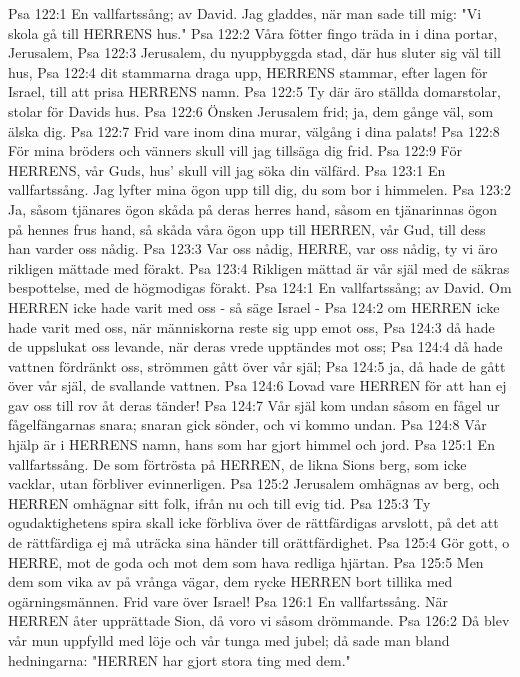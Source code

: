 Psa 122:1  En vallfartssång; av David. Jag gladdes, när man sade till mig: "Vi skola gå till HERRENS hus."
Psa 122:2  Våra fötter fingo träda in i dina portar, Jerusalem,
Psa 122:3  Jerusalem, du nyuppbyggda stad, där hus sluter sig väl till hus,
Psa 122:4  dit stammarna draga upp, HERRENS stammar, efter lagen för Israel, till att prisa HERRENS namn.
Psa 122:5  Ty där äro ställda domarstolar, stolar för Davids hus.
Psa 122:6  Önsken Jerusalem frid; ja, dem gånge väl, som älska dig.
Psa 122:7  Frid vare inom dina murar, välgång i dina palats!
Psa 122:8  För mina bröders och vänners skull vill jag tillsäga dig frid.
Psa 122:9  För HERRENS, vår Guds, hus' skull vill jag söka din välfärd.
Psa 123:1  En vallfartssång. Jag lyfter mina ögon upp till dig, du som bor i himmelen.
Psa 123:2  Ja, såsom tjänares ögon skåda på deras herres hand, såsom en tjänarinnas ögon på hennes frus hand, så skåda våra ögon upp till HERREN, vår Gud, till dess han varder oss nådig.
Psa 123:3  Var oss nådig, HERRE, var oss nådig, ty vi äro rikligen mättade med förakt.
Psa 123:4  Rikligen mättad är vår själ med de säkras bespottelse, med de högmodigas förakt.
Psa 124:1  En vallfartssång; av David. Om HERREN icke hade varit med oss - så säge Israel -
Psa 124:2  om HERREN icke hade varit med oss, när människorna reste sig upp emot oss,
Psa 124:3  då hade de uppslukat oss levande, när deras vrede upptändes mot oss;
Psa 124:4  då hade vattnen fördränkt oss, strömmen gått över vår själ;
Psa 124:5  ja, då hade de gått över vår själ, de svallande vattnen.
Psa 124:6  Lovad vare HERREN för att han ej gav oss till rov åt deras tänder!
Psa 124:7  Vår själ kom undan såsom en fågel ur fågelfängarnas snara; snaran gick sönder, och vi kommo undan.
Psa 124:8  Vår hjälp är i HERRENS namn, hans som har gjort himmel och jord.
Psa 125:1  En vallfartssång. De som förtrösta på HERREN, de likna Sions berg, som icke vacklar, utan förbliver evinnerligen.
Psa 125:2  Jerusalem omhägnas av berg, och HERREN omhägnar sitt folk, ifrån nu och till evig tid.
Psa 125:3  Ty ogudaktighetens spira skall icke förbliva över de rättfärdigas arvslott, på det att de rättfärdiga ej må uträcka sina händer till orättfärdighet.
Psa 125:4  Gör gott, o HERRE, mot de goda och mot dem som hava redliga hjärtan.
Psa 125:5  Men dem som vika av på vrånga vägar, dem rycke HERREN bort tillika med ogärningsmännen. Frid vare över Israel!
Psa 126:1  En vallfartssång. När HERREN åter upprättade Sion, då voro vi såsom drömmande.
Psa 126:2  Då blev vår mun uppfylld med löje och vår tunga med jubel; då sade man bland hedningarna: "HERREN har gjort stora ting med dem."
